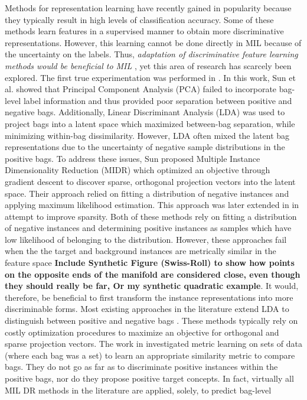 Methods for representation learning have recently gained in popularity because they typically result in high levels of classification accuracy.  Some of these methods  learn features in a supervised manner to obtain more discriminative representations.  However, this learning cannot be done directly in  MIL because of the uncertainty on the labels.  Thus, \textit{adaptation of discriminative  feature learning methods would be beneficial to MIL} \citep{Carbonneau2016MILSurvey}, yet this area of research has scarcely been explored.  The first true experimentation was performed in \citep{Sun2010MIDR}.  In this work, Sun et al. showed that Principal Component Analysis (PCA) failed to incorporate bag-level label information and thus provided poor separation between positive and negative bags.  Additionally, Linear Discriminant Analysis (LDA) was used to project bags into a latent space which maximized between-bag separation, while minimizing within-bag dissimilarity.  However, LDA often mixed the latent bag representations due to the uncertainty of negative sample distributions in the positive bags.  To address these issues, Sun proposed Multiple Instance Dimensionality Reduction (MIDR) which optimized an objective through gradient descent to discover sparse, orthogonal projection vectors into the latent space.  Their approach relied on fitting a distribution of negative instances and applying maximum likelihood estimation.  This approach was later extended in \citep{Zhu2018MIDRSparsity} in attempt to improve sparsity.  Both of these methods rely on fitting a distribution of negative instances and determining positive instances as samples which have low likelihood of belonging to the distribution.  However, these approaches fail when the the target and background instances are metrically similar in the feature space \textbf{Include Synthetic Figure (Swiss-Roll) to show how points on the opposite ends of the manifold are considered close, even though they should really be far, Or my synthetic quadratic example}.  It would, therefore, be beneficial to first transform the instance representations into more discriminable forms.  Most existing approaches in the literature extend LDA to distinguish between positive and negative bags \citep{Chai2014MIDA,Zhu2018MIDRSparsity}.  These methods typically rely on costly optimization procedures to maximize an objective for orthogonal and sparse projection vectors.  The work in \citep{Xu2011MI_Metric_Learning} investigated metric learning on sets of data (where each bag was a set) to learn an appropriate similarity metric to compare bags.  They do not go as far as to discriminate positive instances within the positive bags, nor do they propose positive target concepts.  In fact, virtually all MIL DR methods in the literature are applied, solely, to predict bag-level 